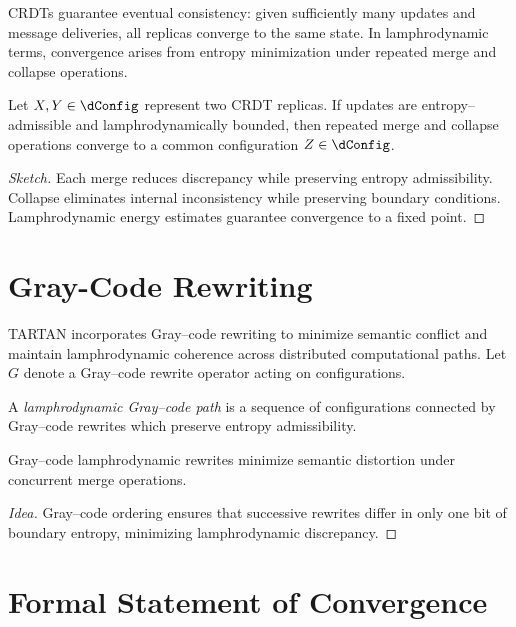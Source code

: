 CRDTs guarantee eventual consistency: given sufficiently many updates
and message deliveries, all replicas converge to the same state. In
lamphrodynamic terms, convergence arises from entropy minimization under
repeated merge and collapse operations.

\begin{proposition}
Let $X,Y\in\dConfig$ represent two CRDT replicas. If updates are
entropy--admissible and lamphrodynamically bounded, then repeated merge
and collapse operations converge to a common configuration
$Z\in\dConfig$.
\end{proposition}

\begin{proof}[Sketch]
Each merge reduces discrepancy while preserving entropy admissibility.
Collapse eliminates internal inconsistency while preserving boundary
conditions. Lamphrodynamic energy estimates guarantee convergence to a
fixed point.
\end{proof}


\section{Gray-Code Rewriting}

TARTAN incorporates Gray--code rewriting to minimize semantic conflict
and maintain lamphrodynamic coherence across distributed computational
paths. Let $G$ denote a Gray--code rewrite operator acting on
configurations.

\begin{definition}
A \emph{lamphrodynamic Gray--code path} is a sequence of configurations
connected by Gray--code rewrites which preserve entropy admissibility.
\end{definition}

\begin{proposition}
Gray--code lamphrodynamic rewrites minimize semantic distortion under
concurrent merge operations.
\end{proposition}

\begin{proof}[Idea]
Gray--code ordering ensures that successive rewrites differ in only one
bit of boundary entropy, minimizing lamphrodynamic discrepancy.
\end{proof}


\section{Formal Statement of Convergence}

